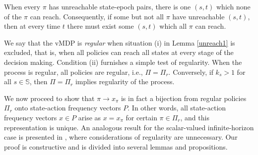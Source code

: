 \documentclass{article}
\theoremstyle{definition}
\numberwithin{equation}{section}
\begin{document}
{%



When every $\pi$ has unreachable state-epoch pairs, 
there is one $(s,t)$ which none of the $\pi$ can reach. Consequently, if some but not all $\pi$ have unreachable $(s,t)$, then at every
time $t$ there must exist some $(s,t)$ which all $\pi$ can reach.



We say that the vMDP is {\it regular} when situation (i) in Lemma \ref{unreach1} is excluded, that is, when all policies can reach all states at every stage of the decision making. Condition (ii) 
furnishes a simple test of regularity. 
When the process is regular, all policies are regular, i.e.,
$\Pi = \Pi_r$. 
Conversely,
if $k_s > 1$ for all $s\in \mathbb{S}$, then $\Pi = \Pi_r$ implies regularity of the process.









We now proceed to show that
$\pi \to x_\pi$ is in fact a bijection from regular policies
$\Pi_r$ onto state-action frequency vectors $P$. 
In other words, all state-action frequency vectors $x\in P$
arise as $x=x_\pi$ for certain $\pi \in \Pi_r$, and this representation  is unique.
%
An analogous result for the scalar-valued infinite-horizon case is presented in \cite[pp. 225-226]{16},
where considerations of regularity are unnecessary.  Our proof is constructive and is 
divided into several lemmas and propositions.


}
\end{document}
